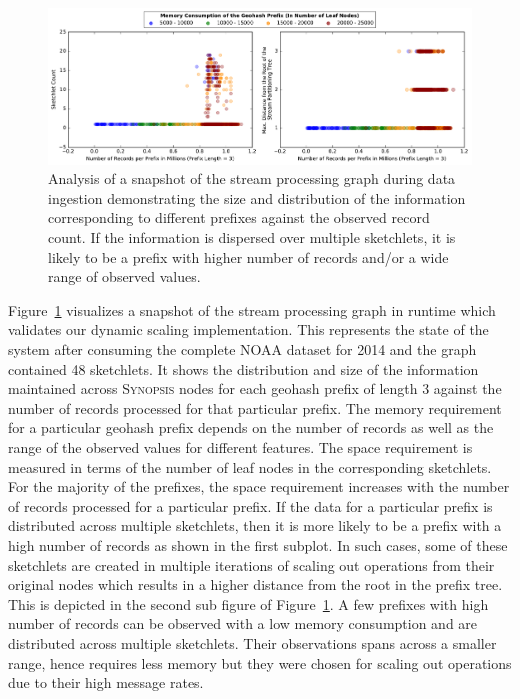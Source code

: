 \begin{figure}[h!]
    \centerline{\includegraphics[width=\linewidth]{figures/scaleout_graph_analysis.pdf}}
    \caption{Analysis of a snapshot of the stream processing graph during data ingestion demonstrating the size and distribution of the information corresponding to different prefixes against the observed record count. If the information is dispersed over multiple sketchlets, it is likely to be a prefix with higher number of records and/or a wide range of observed values.}
    \label{fig:scaleout-graph-analysis}
\end{figure}

Figure~\ref{fig:scaleout-graph-analysis} visualizes a snapshot of the stream processing graph in runtime which validates our dynamic scaling implementation. 
This represents the state of the system after consuming the complete NOAA dataset for 2014 and the graph contained 48 sketchlets. 
It shows the distribution and size of the information maintained across \textsc{Synopsis} nodes for each geohash prefix of length 3 against the number of records processed for that particular prefix.
The memory requirement for a particular geohash prefix depends on the number of records as well as the range of the observed values for different features.
The space requirement is measured in terms of the number of leaf nodes in the corresponding sketchlets.
For the majority of the prefixes, the space requirement increases with the number of records processed for a particular prefix.
If the data for a particular prefix is distributed across multiple sketchlets, then it is more likely to be a prefix with a high number of records as shown in the first subplot.
In such cases, some of these sketchlets are created in multiple iterations of scaling out operations from their original nodes which results in a higher distance from the root in the prefix tree. This is depicted in the second sub figure of Figure~\ref{fig:scaleout-graph-analysis}.
A few prefixes with high number of records can be observed with a low memory consumption and are distributed across multiple sketchlets.
Their observations spans across a smaller range, hence requires less memory but they were chosen for scaling out operations due to their high message rates. 


